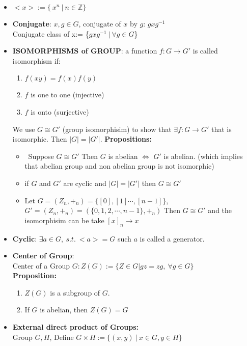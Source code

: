 \documentclass[12pt]{article}
\begin{document}
\begin{itemize}
        \item $<x> := \{\ x^n \ | \ n \in \mathbb{Z}\}$
        \item \textbf{Conjugate}: $x,g\in G$, conjugate of $x$ by $g$: $gxg^{-1}$\\
        Conjugate class of x:= \{$gxg^{-1} \ | \ \forall g \in G$\}
        \item \textbf{ISOMORPHISMS of GROUP}: a function $f : G \rightarrow G'$ is called isomorphism if:
        \begin{enumerate}
            \item $f(xy) = f(x)f(y)$
            \item $f$ is one to one (injective)
            \item $f$ is onto (surjective)
        \end{enumerate}
        We use $G \cong G'$ (group isomorphisim) to show that $\exists f:G \rightarrow G'$ that is isomorphic. Then $|G| = |G'|$.
        \textbf{Propositions:}
        \begin{itemize}
            \item \ Suppose $G\cong  G'$ Then $G$ is abelian $\Leftrightarrow$ $G'$ is abelian. (which implies that abelian group and non abelian group is not isomorphic)
            \item if $G$ and $G'$ are cyclic and $|G| = |G'|$ then $G\cong G'$ 
            \item Let $G = (Z_n, +_n) = \{[0], [1] \cdots, [n-1]\}$, $G' = (Z_n, +_n) = (\{0,1,2,\cdots, n-1\}, +_n)$
            Then $G\cong G'$ and the isomorphisim can be take $[x]_n \rightarrow x$
        \end{itemize}
        \item \textbf{Cyclic}: $\exists a \in G, \ s.t. \ <a> = G$ such $a$ is called a generator.
        \item \textbf{Center of Group}:\\
        Center of a Group $G: Z(G):= \{Z\in G | gz = zg, \ \forall g \in G\}$\\
        \textbf{Proposition:}
        \begin{enumerate}
            \item $Z(G)$ is a subgroup of $G$.
            \item If $G$ is abelian, then $Z(G) = G$
        \end{enumerate}
        \item \textbf{External direct product of Groups:}\\
        Group $G, H$, Define $G \times H :=\{(x,y) \ | \ x\in G, y \in H\}$\\

\end{itemize}
\end{document}
